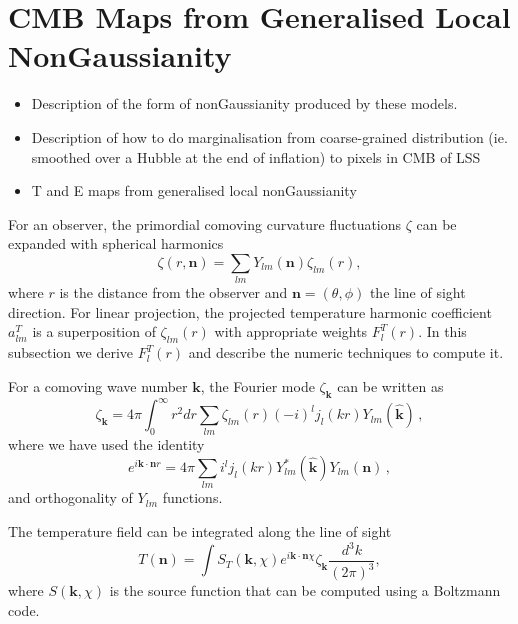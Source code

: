 \section{CMB Maps from Generalised Local NonGaussianity}
\begin{itemize}
\item Description of the form of nonGaussianity produced by these models.
\item Description of how to do marginalisation from coarse-grained distribution (ie. smoothed over a Hubble at the end of inflation) to pixels in CMB of LSS
\item T and E maps from generalised local nonGaussianity
\end{itemize}

For an observer,  the primordial comoving curvature fluctuations  $\zeta$ can be expanded with spherical harmonics
\begin{equation}
  \zeta(r, \mathbf{n}) = \sum_{lm} Y_{lm}(\mathbf{n})\zeta_{lm}(r),
\end{equation}
where $r$ is the distance from the observer and $\mathbf{n} = (\theta, \phi)$ the line of sight direction. For linear projection, the projected temperature harmonic coefficient $a_{lm}^T$ is a superposition of $\zeta_{lm}(r)$ with appropriate weights $F_l^T(r)$. In this subsection we derive $F_l^T(r)$ and describe the numeric techniques to compute it.

 For a comoving wave number $\mathbf{k}$, the Fourier mode $\zeta_{\mathbf{k}}$ can be written as
\begin{equation}
  \zeta_{\mathbf{k}} = 4\pi \int_0^\infty r^2dr\sum_{lm}\zeta_{lm}(r) (-i)^l j_l(kr) Y_{lm}(\hat{\mathbf{k}})\, , \label{eq:zetakint}
\end{equation}
where we have used the identity
\begin{equation}
  e^{i\mathbf{k}\cdot\mathbf{n}r} = 4\pi \sum_{lm}i^l j_l(kr) Y^*_{lm}(\hat{\mathbf{k}}) Y_{lm}(\mathbf{n}) \, , \label{eq:eikx_expand}
\end{equation}
and orthogonality of $Y_{lm}$ functions.


The temperature field can be integrated along the line of sight
\begin{equation}
T({\mathbf{n}}) = \int S_T(\mathbf{k}, \chi) e^{i \mathbf{k}\cdot\mathbf{n} \chi}\zeta_{\mathbf{k}}\frac{d^3k}{(2\pi)^3}, \label{eq:Tint1}
\end{equation}
where $S(\mathbf{k}, \chi)$ is the source function that can be computed using a Boltzmann code.

